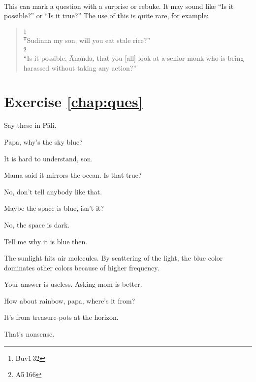 \paragraph*{} This can mark a question with a surprise or rebuke. It may sound like ``Is it possible?'' or ``Is it true?'' The use of this is quite rare, for example:

\begin{quote}
\footnote{Buv1\,32}\\
``Sudinna my son, will you eat stale rice?''\\[1.5mm]
\footnote{A5\,166}\\
``Is it possible, \=Ananda, that you [all] look at a senior monk who is being harassed without taking any action?''\\[1.5mm]
\end{quote}


\section*{Exercise \ref{chap:ques}}
Say these in P\=ali.
\begin{compactenum}
\item Papa, why's the sky blue?
\item It is hard to understand, son.
\item Mama said it mirrors the ocean. Is that true?
\item No, don't tell anybody like that.
\item Maybe the space is blue, isn't it?
\item No, the space is dark.
\item Tell me why it is blue then.
\item The sunlight hits air molecules. By scattering of the light, the blue color dominates other colors because of higher frequency.
\item Your answer is useless. Asking mom is better.
\item How about rainbow, papa, where's it from?
\item It's from treasure-pots at the horizon.
\item That's nonsense.
\end{compactenum}
